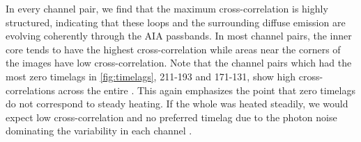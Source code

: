 In every channel pair, we find that the maximum cross-correlation is highly structured, indicating that these loops and the surrounding diffuse emission are evolving coherently through the AIA passbands. In most channel pairs, the inner core tends to have the highest cross-correlation while areas near the corners of the images have low cross-correlation. Note that the channel pairs which had the most zero timelags in \autoref{fig:timelags}, 211-193 and 171-131, show high cross-correlations across the entire \AR{}. This again emphasizes the point that zero timelags do not correspond to steady heating. If the whole \AR{} was heated steadily, we would expect low cross-correlation and no preferred timelag due to the photon noise dominating the variability in each channel \citep{viall_signatures_2016}.
